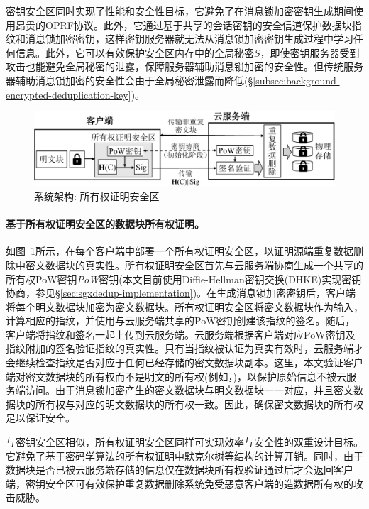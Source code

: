 密钥安全区同时实现了性能和安全性目标，它避免了在消息锁加密密钥生成期间使用昂贵的OPRF协议\cite{bellare2013DupLESS}。此外，它通过基于共享的会话密钥的安全信道保护数据块指纹和消息锁加密密钥，这样密钥服务器就无法从消息锁加密密钥生成过程中学习任何信息。此外，它可以有效保护安全区内存中的全局秘密$S$，即使密钥服务器受到攻击也能避免全局秘密的泄露，保障服务器辅助消息锁加密的安全性。但传统服务器辅助消息锁加密的安全性会由于全局秘密泄露而降低(\S\ref{subsec:background-encrypted-deduplication-key})。

\begin{figure}[!htb]
    \centering
    \includegraphics[width=\textwidth]{pic/sgxdedup/pow.pdf}
    \caption{\sysnameS 系统架构: 所有权证明安全区}
    \label{fig:sgxdedup-overview-pow}
\end{figure}

\paragraph*{基于所有权证明安全区的数据块所有权证明。}如图~\ref{fig:sgxdedup-overview-pow}所示，\sysnameS 在每个客户端中部署一个所有权证明安全区，以证明源端重复数据删除中密文数据块的真实性。所有权证明安全区首先与云服务端协商生成一个共享的所有权PoW密钥\textit{PoW}密钥(本文目前使用Diffie-Hellman密钥交换(DHKE)实现密钥协商，参见\S\ref{sec:sgxdedup-implementation})。在生成消息锁加密密钥后，客户端将每个明文数据块加密为密文数据块。所有权证明安全区将密文数据块作为输入，计算相应的指纹，并使用与云服务端共享的PoW密钥创建该指纹的签名。随后，客户端将指纹和签名一起上传到云服务端。云服务端根据客户端对应PoW密钥及指纹附加的签名验证指纹的真实性。只有当指纹被认证为真实有效时，云服务端才会继续检查指纹是否对应于任何已经存储的密文数据块副本。这里，本文验证客户端对密文数据块的所有权而不是明文的所有权(例如，\cite{halevi11})，以保护原始信息不被云服务端访问。由于消息锁加密产生的密文数据块与明文数据块一一对应，并且密文数据块的所有权与对应的明文数据块的所有权一致。因此，确保密文数据块的所有权足以保证安全。

与密钥安全区相似，所有权证明安全区同样可实现效率与安全性的双重设计目标。它避免了基于密码学算法的所有权证明中默克尔树等结构的计算开销。同时，由于数据块是否已被云服务端存储的信息仅在数据块所有权验证通过后才会返回客户端，密钥安全区可有效保护重复数据删除系统免受恶意客户端的造数据所有权的攻击威胁。


